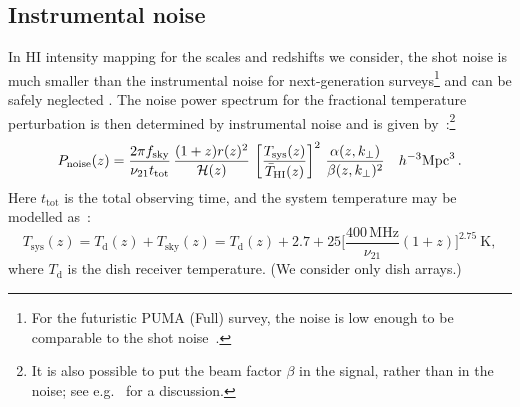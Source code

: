\subsection{Instrumental noise}\label{ssec:inoise}
%
In HI intensity mapping for the scales and redshifts we consider, the shot noise is much smaller than the instrumental noise for next-generation surveys\footnote{{For the futuristic PUMA (Full) survey, the noise is low enough to be comparable to the shot noise~\cite{Chen:2018qiu}.}} and can be safely neglected \cite{Castorina:2016bfm,Villaescusa-Navarro:2018vsg}. 
The noise power spectrum for the fractional temperature perturbation is then determined by instrumental noise and is given by~\cite{Bull:2014rha,Alonso:2017dgh}:\footnote{It is also possible to put the beam factor $\beta$ in the signal, rather than in the noise; see e.g.~\cite{Bernal:2019jdo} for a discussion.}
\begin{equation}
{P}_{\mathrm{noise}}(z) = \frac{2\pi f_{\mathrm{sky}}}{\nu_{21} t_{\mathrm{tot}}}\,\frac{(1+z) r(z)^{2} }{\mathcal{H}(z) }\,\left[\frac{T_{\mathrm{sys}}(z)}{\bar{T}_{\mathrm{HI}}(z)}\right]^2\, \frac{\alpha(z,k_\perp)}{\beta(z,k_\perp)^2}
~~~ h^{-3}\mathrm{Mpc}^{3} \,. 
\label{e2.24}
\end{equation}
Here $t_\mathrm{tot}$ is the total observing time, and  the system temperature may be modelled as~\citep{Ansari:2018ury}:
\begin{equation}
T_{\mathrm{sys}}(z) = T_\mathrm{d}(z)+T_\mathrm{sky}(z) =T_\mathrm{d}(z) + 2.7 + 25\bigg[\frac{400\,\mathrm{MHz}}{\nu_{21}} (1+z)\bigg]^{2.75} ~ \mathrm{K}, \label{e2.25}
\end{equation} 
where $T_\mathrm{d}$ is the dish receiver temperature. (We consider only dish arrays.)

